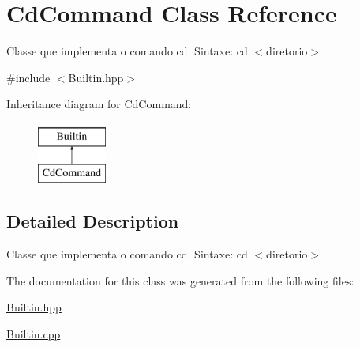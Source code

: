 \hypertarget{classCdCommand}{
\section{CdCommand Class Reference}
\label{classCdCommand}
}


Classe que implementa o comando cd. Sintaxe: cd $<$diretorio$>$  




{\ttfamily \#include $<$Builtin.hpp$>$}

Inheritance diagram for CdCommand:\begin{figure}[H]
\begin{center}
\leavevmode
\includegraphics[height=2.000000cm]{classCdCommand}
\end{center}
\end{figure}


\subsection{Detailed Description}
Classe que implementa o comando cd. Sintaxe: cd $<$diretorio$>$ 

The documentation for this class was generated from the following files:\begin{DoxyCompactItemize}
\item 
\hyperlink{Builtin_8hpp}{Builtin.hpp}\item 
\hyperlink{Builtin_8cpp}{Builtin.cpp}\end{DoxyCompactItemize}
